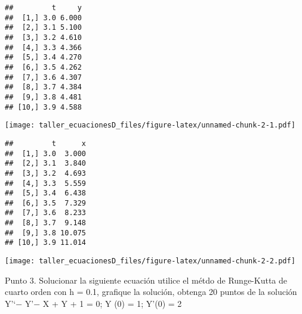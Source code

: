 \documentclass[]{article}
\begin{document}
\begin{verbatim}
##         t     y
##  [1,] 3.0 6.000
##  [2,] 3.1 5.100
##  [3,] 3.2 4.610
##  [4,] 3.3 4.366
##  [5,] 3.4 4.270
##  [6,] 3.5 4.262
##  [7,] 3.6 4.307
##  [8,] 3.7 4.384
##  [9,] 3.8 4.481
## [10,] 3.9 4.588
\end{verbatim}

\texttt{[image: taller\_ecuacionesD\_files/figure-latex/unnamed-chunk-2-1.pdf]}

\begin{verbatim}
##         t      x
##  [1,] 3.0  3.000
##  [2,] 3.1  3.840
##  [3,] 3.2  4.693
##  [4,] 3.3  5.559
##  [5,] 3.4  6.438
##  [6,] 3.5  7.329
##  [7,] 3.6  8.233
##  [8,] 3.7  9.148
##  [9,] 3.8 10.075
## [10,] 3.9 11.014
\end{verbatim}

\texttt{[image: taller\_ecuacionesD\_files/figure-latex/unnamed-chunk-2-2.pdf]}

Punto 3. Solucionar la siguiente ecuación utilice el métdo de
Runge-Kutta de cuarto orden con h = 0.1, grafique la solución, obtenga
20 puntos de la solución Y'`− Y'− X + Y + 1 = 0; Y (0) = 1; Y'(0) = 2
\end{document}
